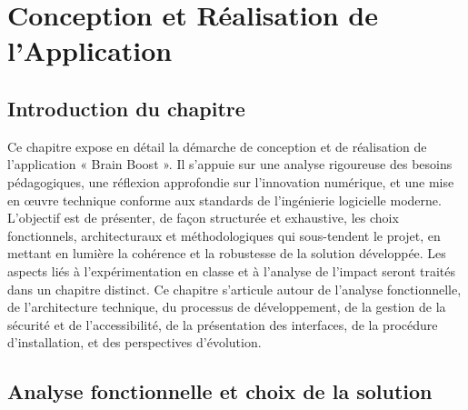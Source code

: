 \documentclass[a4paper,11pt]{report}
\begin{document}
\chapter{Conception et Réalisation de l'Application}

\section*{Introduction du chapitre}
Ce chapitre expose en détail la démarche de conception et de réalisation de l'application « Brain Boost ». Il s'appuie sur une analyse rigoureuse des besoins pédagogiques, une réflexion approfondie sur l'innovation numérique, et une mise en œuvre technique conforme aux standards de l'ingénierie logicielle moderne. L'objectif est de présenter, de façon structurée et exhaustive, les choix fonctionnels, architecturaux et méthodologiques qui sous-tendent le projet, en mettant en lumière la cohérence et la robustesse de la solution développée. Les aspects liés à l'expérimentation en classe et à l'analyse de l'impact seront traités dans un chapitre distinct. Ce chapitre s'articule autour de l'analyse fonctionnelle, de l'architecture technique, du processus de développement, de la gestion de la sécurité et de l'accessibilité, de la présentation des interfaces, de la procédure d'installation, et des perspectives d'évolution.

\section{Analyse fonctionnelle et choix de la solution}
\end{document}
